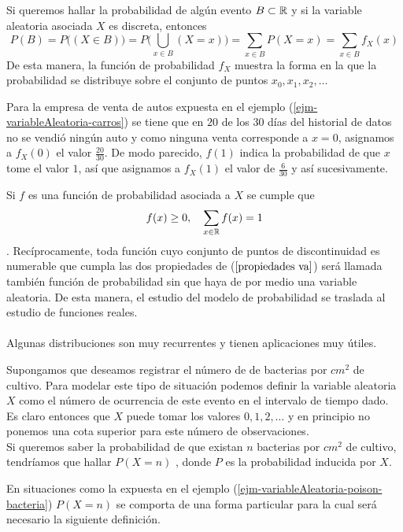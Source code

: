 Si queremos hallar la probabilidad de algún evento $B\subset{\mathbb{R}}$ y si la variable aleatoria asociada $X$ es discreta, entonces
$$P(B)=P\big((X\in B)\big)=P\big(\bigcup_{x\in B}(X=x)\big)=\sum_{x\in B}P(X=x)=\sum_{x\in B}f_X(x)$$
De esta manera, la función de probabilidad $f_X$ muestra la forma en la que la probabilidad se distribuye sobre el conjunto de puntos $x_0,x_1,x_2,\ldots$
\begin{Ejm}
    Para la empresa de venta de autos expuesta en el ejemplo (\ref{ejm-variableAleatoria-carros}) se tiene que en $20$ de los 30 días del historial de datos no se vendió ningún auto y como ninguna venta corresponde a $x=0$, asignamos a $f_X(0)$ el
    valor $\frac{20}{30}$. De modo parecido, $f(1)$ indica la probabilidad de que $x$ tome el valor $1$, así que asignamos a $f_X(1)$ el valor de $\frac{6}{30}$ y así sucesivamente.
\end{Ejm}
Si $f$ es una función de probabilidad asociada a $X$ se cumple que 
\begin{eqnarray}
    f(x)\geq 0,\quad\sum_{x\in {\mathbb{R}}}f(x)=1 \label{prop-variableAleatoria-sumaUno}
\end{eqnarray}.
Recíprocamente, toda función cuyo conjunto de puntos de discontinuidad es numerable que cumpla las dos propiedades de ($\ref{propiedades va}$) será llamada también función de probabilidad sin que haya de por medio una variable aleatoria. De esta manera, el estudio del modelo de probabilidad se traslada al estudio de funciones reales.\\\\
Algunas distribuciones son muy recurrentes y tienen aplicaciones muy útiles.
\begin{Ejm}
\label{ejm-variableAleatoria-poison-bacteria}
    Supongamos que deseamos  registrar el número de de bacterias por $cm^2$ de cultivo. Para modelar este tipo de situación podemos definir la variable aleatoria $X$ como el número de ocurrencia de este evento en el intervalo de tiempo dado. Es claro entonces que $X$ puede tomar los valores $0,1,2,\ldots$ y en principio no ponemos una cota superior para este número de observaciones.\\ Si queremos saber la probabilidad de que existan $n$ bacterias por $cm^2$ de cultivo, tendríamos que hallar $P(X=n)$ , donde $P$ es la probabilidad inducida por $X$.
\end{Ejm}
En situaciones como la expuesta en el ejemplo  (\ref{ejm-variableAleatoria-poison-bacteria}) $P(X=n)$ se comporta de una forma particular para la cual será necesario la siguiente definición.
